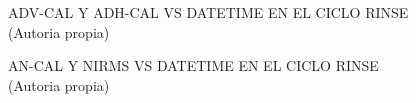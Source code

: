 \begin{figure}[H]
  \hfill
  \hfill
  \hfill
  \caption{ADV-CAL Y ADH-CAL VS DATETIME EN EL CICLO RINSE (Autoria propia)}
  \end{figure}
\begin{figure}[H]
  \hfill
  \hfill
  \hfill
  \caption{AN-CAL Y NIRMS VS DATETIME EN EL CICLO RINSE (Autoria propia)}
  \end{figure}
